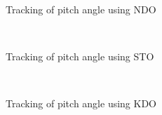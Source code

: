 \documentclass[letterpaper%
, twoside%
, 12pt%
,memoire%
, english%
,creativecommons,hyperref%
]{thETS}
\theoremstyle{newThmStyle}
\begin{document}
\begin{figure}[H]
\centering
{}
\\ \parbox{0.75\textwidth}{\caption{Tracking of pitch angle using NDO}
\label{pitch_trac_dis_m1_ndo}}
\end{figure}

\begin{figure}[H]
\centering
{}
\\ \parbox{0.75\textwidth}{\caption{Tracking of pitch angle using STO}
\label{pitch_trac_dis_m1_sto}}
\end{figure}

\begin{figure}[H]
\centering
{}
\\ \parbox{0.75\textwidth}{\caption{Tracking of pitch angle using KDO}
\label{pitch_trac_dis_m1_kdo}}
\end{figure}
\end{document}
